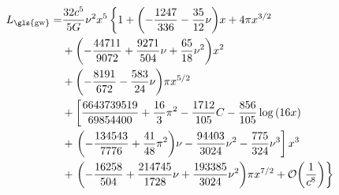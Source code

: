 \begin{align}
L_\text{\gls{gw}} = & \frac{32 c^5}{5 G}\nu^2 x^5 \left\{ 1 + \lr{-\frac{1247}{336}-\frac{35}{12}\nu}x + 4\pi x^{3/2}\right.\nonumber\\
& + \lr{-\frac{44711}{9072}+\frac{9271}{504}\nu+\frac{65}{18}\nu^2}x^2\nonumber\\
& + \lr{-\frac{8191}{672}-\frac{583}{24}\nu}\pi x^{5/2}\nonumber\\
& + \left[ \frac{6643739519}{69854400}+\frac{16}{3}\pi^2 -\frac{1712}{105}C-\frac{856}{105}\log\lr{16 x}\right.\nonumber\\
& + \left. \lr{-\frac{134543}{7776}+\frac{41}{48}\pi^2}\nu - \frac{94403}{3024}\nu^2 - \frac{775}{324}\nu^3\right] x^3\nonumber\\
& + \left. \lr{-\frac{16258}{504}+\frac{214745}{1728}\nu + \frac{193385}{3024}\nu^2}\pi x^{7/2}+\mathcal{O}\lr{\frac{1}{c^8}}\right\}
\end{align}

